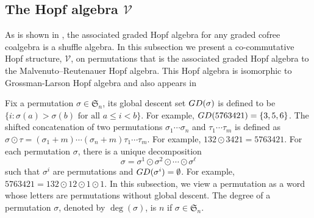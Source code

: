 \documentclass[12pt]{amsart}
\numberwithin{equation}{section}
\newcommand{\fS}{\mathfrak{S}}
\newcommand{\NSym}{\mathrm{NSym}}
\newcommand{\QSym}{\mathrm{QSym}}
\newcommand{\Sym}{\mathrm{Sym}}
\begin{document}
\begin{center}
\end{center}

\subsection{The Hopf algebra $\mathcal{V}$}

As is shown in \cite{A05}, the associated graded Hopf algebra for any graded cofree coalgebra is a shuffle algebra. In this subsection we present a co-commutative Hopf structure, $\mathcal{V}$, on permutations that is the associated graded Hopf algebra to the Malvenuto–Reutenauer Hopf algebra. This Hopf algebra is isomorphic to Grossman-Larson Hopf algebra \cite{G89} and also appears in \cite{L21,V14}

Fix a permutation $\sigma\in\mathfrak{S}_n$, its global descent set $\rm{GD}(\sigma)$ is defined to be $\{i:\sigma(a)>\sigma(b)\text{ for all }a\leq i<b\}$. For example, $\rm{GD}(5763421)=\{3,5,6\}$. The shifted concatenation of two permutations $\sigma_1\cdots\sigma_n$ and $\tau_1\cdots\tau_m$ is defined as $\sigma\odot\tau=(\sigma_1+m)\cdots(\sigma_n+m)\tau_1\cdots\tau_m$. For example, $132\odot 3421=5763421$. For each permutation $\sigma$, there is a unique decomposition
$$\sigma=\sigma^1\odot\sigma^2\odot\cdots\odot\sigma^\ell$$
such that $\sigma^i$ are permutations and $\rm{GD}(\sigma^i)=\emptyset$. For example, $5763421=132\odot12\odot1\odot1$. In this subsection, we view a permutation as a word whose letters are permutations without global descent. The degree of a permutation $\sigma$, denoted by $\deg(\sigma)$, is $n$ if $\sigma\in\fS_n$.
\end{document}
